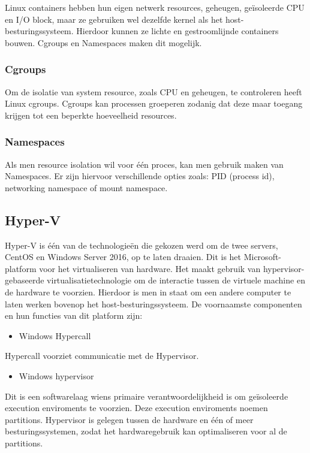 Linux containers hebben hun eigen netwerk resources, geheugen, geïsoleerde CPU en I/O block, maar ze gebruiken wel dezelfde kernel als het host-besturingssysteem. Hierdoor kunnen ze lichte en gestroomlijnde containers bouwen. Cgroups en Namespaces maken dit mogelijk. \autocite{Wang2017}

\subsubsection{Cgroups}
Om de isolatie van system resource, zoals CPU en geheugen, te controleren heeft Linux cgroups. Cgroups kan processen groeperen zodanig dat deze maar toegang krijgen tot een beperkte hoeveelheid resources. \autocite{Weissig2013}

\subsubsection{Namespaces}
Als men resource isolation wil voor één proces, kan men gebruik maken van Namespaces. Er zijn hiervoor verschillende opties zoals: PID (process id), networking namespace of mount namespace. \autocite{Evans2016}

\subsection{Hyper-V}
Hyper-V is één van de technologieën die gekozen werd om de twee servers, CentOS en Windows Server 2016, op te laten draaien. Dit is het Microsoft-platform voor het virtualiseren van hardware. Het maakt gebruik van hypervisor-gebaseerde virtualisatietechnologie om de interactie tussen de virtuele machine en de hardware te voorzien. Hierdoor is men in staat om een andere computer te laten werken bovenop het host-besturingssysteem. De voornaamste componenten en hun functies van dit platform zijn: \autocite{Cooley2018}

\begin{itemize}[noitemsep]
	\item Windows Hypercall
\end{itemize}

Hypercall voorziet communicatie met de Hypervisor.

\begin{itemize}[noitemsep]
	\item Windows hypervisor
\end{itemize}

Dit is een softwarelaag wiens primaire verantwoordelijkheid is om geïsoleerde execution enviroments te voorzien. Deze execution enviroments noemen partitions. Hypervisor is gelegen tussen de hardware en één of meer besturingssystemen, zodat het hardwaregebruik kan optimaliseren voor al de partitions.

